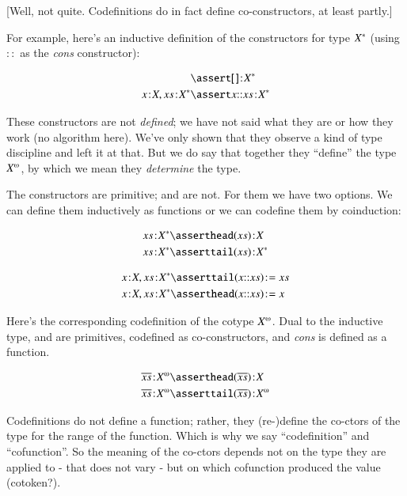 [Well, not quite. Codefinitions do in fact define co-constructors, at
  least partly.]

For example, here's an inductive definition of the constructors for
type \({X^{*}}\) (using \(\mathpunct{::}\) as the \textit{cons}
constructor):

\begin{align}
  & \linfer \tj{\listld\,\listrd}{\List{X}} \\
  \tj{x}{X}, \tj{\seq{x}}{\List{X}} &\linfer \tj{x\cons{}\seq{x}}{\List{X}} \\
\end{align}

These constructors are not \textit{defined}; we have not said what
they are or how they work (no algorithm here). We've only shown that
they observe a kind of type discipline and left it at that. But we do
say that together they ``define'' the type \(\colist{X}\), by which
we mean they \textit{determine} the type.

The constructors are primitive; \head{} and \tail{} are not. For them
we have two options. We can define them inductively as functions or we
can codefine them by coinduction:

\begin{align}
  \tj{\seq{x}}{\List{X}} & \linfer \tj{\head(\seq{x})}{X} \\
  \tj{\seq{x}}{\List{X}} & \linfer \tj{\tail(\seq{x})}{\List X}
\end{align}

\begin{align}
  \tj{x}{X},\tj{\seq{x}}{\List{X}} & \linfer \tj{\tail(x\cons{}\seq{x})} = \seq{x} \\
  \tj{x}{X},\tj{\seq{x}}{\List{X}} & \linfer \tj{\head(x\cons{}\seq{x})} = x
\end{align}

Here's the corresponding codefinition of the cotype \(\colist{X}\).
Dual to the inductive type, \head{} and \tail{} are primitives, codefined
as co-constructors, and \textit{cons} is defined as a function.

\begin{align}
  \tj{\coseq{x}}{\colist{X}} & \linfer \tj{\head(\coseq{x})}{X} \\
  \tj{\coseq{x}}{\colist{X}} & \linfer \tj{\tail(\coseq{x})}{\colist{X}}
\end{align}



Codefinitions do not define a function; rather, they (re-)define the
co-ctors of the type for the range of the function. Which is why we
say ``codefinition'' and ``cofunction''. So the meaning of the
co-ctors depends not on the type they are applied to - that does not
vary - but on which cofunction produced the value (cotoken?).


